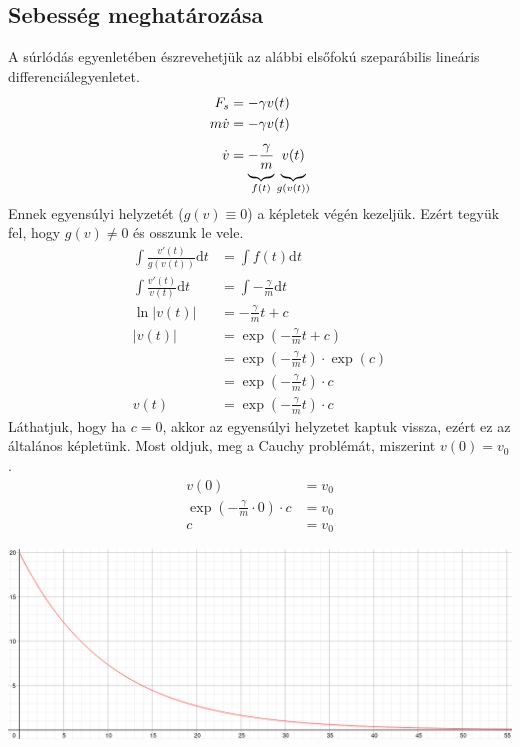 \documentclass[a4paper]{article}
\newcommand{\dd}[1]{\mathrm{d}#1}
\newcommand{\undbr}[1]{\underbrace{#1 \vphantom{\left(\frac{a^{0.3}}{b}\right)}}}
\begin{document}
\begin{multicols}{2}
\section{Sebesség meghatározása}
	A súrlódás egyenletében észrevehetjük az alábbi elsőfokú szeparábilis lineáris differenciálegyenletet.
	\begin{align*}
		F_{s} &= - \gamma v(t) \\
		m \dot{v} &= - \gamma v(t) \\
		\dot{v} &= \undbr{- \frac{\gamma}{m}}_{f(t)} \undbr{v(t)}_{g(v(t))}
	\end{align*}
	Ennek egyensúlyi helyzetét ($g(v) \equiv 0$) a képletek végén kezeljük. Ezért tegyük fel, hogy $g(v) \neq 0$ és osszunk le vele.
	\vfill\pagebreak
	\begin{align*}
		\int \frac{v'(t)}{g(v(t))} \dd{t} &= \int f(t) \dd{t} \\
		\int \frac{v'(t)}{v(t)} \dd{t} &= \int - \frac{\gamma}{m} \dd{t} \\
		\ln |v(t)| &= - \frac{\gamma}{m} t + c \\
		|v(t)| &= \exp\left(- \frac{\gamma}{m} t + c \right) \\
			&= \exp\left(- \frac{\gamma}{m} t \right) \cdot \exp(c) \\
			&= \exp\left(- \frac{\gamma}{m} t \right) \cdot c \\
		v(t) &= \exp\left(- \frac{\gamma}{m} t \right) \cdot c
	\end{align*}
	Láthatjuk, hogy ha $c=0$, akkor az egyensúlyi helyzetet kaptuk vissza, ezért ez az általános képletünk. Most oldjuk, meg a Cauchy problémát, miszerint $v(0) = v_0$.
	\begin{align*}
		v(0) &= v_0 \\
		\exp(- \frac{\gamma}{m} \cdot 0 ) \cdot c &= v_0 \\
		c &= v_0
	\end{align*}

	\begin{center}
		\includegraphics[width=\linewidth]{graphics/velocity.png}
	\end{center}


\end{multicols}
\end{document}
